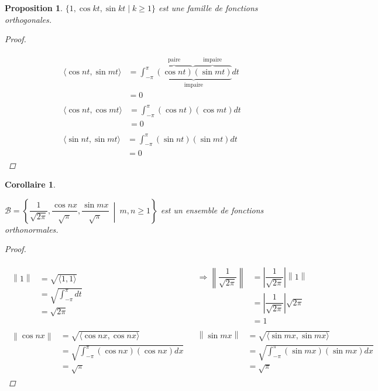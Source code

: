 \documentclass{report}
\newcommand*{\dint}[3]{\displaystyle\int_{#1}^{#2}#3}
\newcommand*{\norme}[1]{\left\| #1 \right\|}
\newcommand*{\abs}[1]{\left| #1 \right|}
\newcommand*{\gte}{\geqslant}
\newtheorem*{prop}{Proposition}
\newtheorem*{coro}{Corollaire}
\theoremstyle{definition}
\theoremstyle{remark}
\begin{document}
	\begin{prop}
		$\{1, \cos kt, \sin kt \mid k \gte 1\}$ est une famille de fonctions orthogonales.
		\begin{proof}~

			\begin{align*}
				\begin{split}
					\langle \cos nt, \sin mt \rangle&= \dint{-\pi}{\pi}{\underbrace{\overbrace{(\cos nt)}^{\text{paire}}\overbrace{(\sin mt)}^{\text{impaire}}}_{\text{impaire}} dt}\\
					&= 0
				\end{split}
				\\[1em]
				\begin{split}
					\langle \cos nt, \cos mt \rangle&= \dint{-\pi}{\pi}{(\cos nt)(\cos mt) dt}\\
					&= 0
				\end{split}
				\\[1em]
				\begin{split}
					\langle \sin nt, \sin mt \rangle&= \dint{-\pi}{\pi}{(\sin nt)(\sin mt) dt}\\
					&= 0
				\end{split}
			\end{align*}
		\end{proof}
	\end{prop}
	\begin{coro}~

		$\mathcal{B} = \left\{ \dfrac{1}{\sqrt{2\pi}}, \dfrac{\cos nx}{\sqrt{\pi}}, \dfrac{\sin mx}{\sqrt{\pi}} ~\middle|~ m,n \gte 1 \right\}$ est un ensemble de fonctions orthonormales.
		\begin{proof}~

			\begin{align*}
				\begin{split}
					\norme{1}&= \sqrt{\langle 1,1 \rangle}\\
					&= \sqrt{\dint{-\pi}{\pi}{dt}}\\
					&= \sqrt{2\pi}
				\end{split}
				&
				\begin{split}
					\Rightarrow\norme{\dfrac{1}{\sqrt{2\pi}}}&= \abs{\dfrac{1}{\sqrt{2\pi}}} \norme{1}\\
					&= \abs{\dfrac{1}{\sqrt{2\pi}}} \sqrt{2\pi}\\
					&= 1
				\end{split}
				\\[1em]
				\begin{split}
					\norme{\cos nx}&= \sqrt{\langle \cos nx, \cos nx \rangle}\\
					&= \sqrt{\dint{-\pi}{\pi}{(\cos nx)(\cos nx)} dx}\\
					&= \sqrt{\pi}
				\end{split}
				&
				\begin{split}
					\norme{\sin mx}&= \sqrt{\langle \sin mx, \sin mx \rangle}\\
					&= \sqrt{\dint{-\pi}{\pi}{(\sin mx)(\sin mx)} dx}\\
					&= \sqrt{\pi}
				\end{split}
			\end{align*}
		\end{proof}
	\end{coro}
\end{document}
